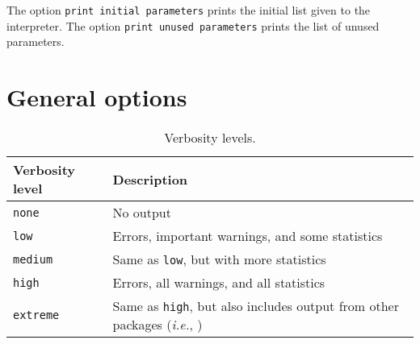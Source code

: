 The option \verb|print initial parameters| prints the initial list given to the
interpreter. The option \verb|print unused parameters| prints the list of unused
parameters.

\section{General options}
\label{sec:options_general}

\begin{table}[h!]
  \begin{center}
    \begin{tabular}{p{3cm} p{12cm}}
      \toprule
      Verbosity level           & Description \\
      \midrule
      \verb!none!               & No output \\
      \verb!low!                & Errors, important warnings, and some statistics \\
      \verb!medium!             & Same as \verb!low!, but with more statistics \\
      \verb!high!               & Errors, all warnings, and all statistics \\
      \verb!extreme!            & Same as \verb!high!, but also includes output from other packages (\textit{i.e.}, \zoltan{}) \\
      \bottomrule
    \end{tabular}
    \caption{Verbosity levels.}
\label{t:verbosity_types}
  \end{center}
\end{table}

